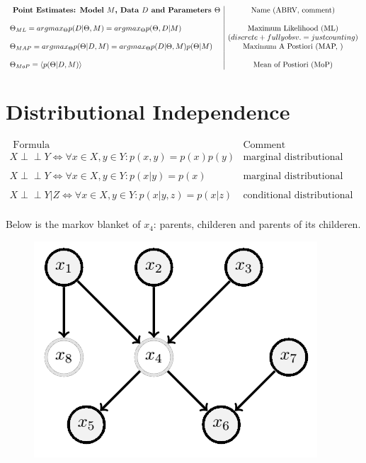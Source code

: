 \documentclass[a4paper,10pt]{article}
\newcommand{\negspace}{\!\!\!}
\newcommand{\idp}{\perp \negspace \perp}
\begin{document}
$$\begin{array}{l|c}
    \textbf{ Point Estimates: \hfill Model $M$, Data $D$ and Parameters $\Theta$} & \textrm{Name \hfill (ABRV, comment)}  \\ 
    \\
     \Theta_{\*ML} = argmax_{\Theta} p( D | \Theta, M) = argmax_{\Theta} p( \Theta, D | M)  & \textrm{Maximum Likelihood \hfill  (ML)} \\
     & ( discrete + fully obsv. = just counting) \\
     \Theta_{\*MAP} = argmax_{\Theta} p( \Theta | D, M) = argmax_{\Theta} p(D|\Theta,M)p(\Theta|M)  & \textrm{Maximum A Postiori \hfill (MAP, )} \\
     \\
     \Theta_{\*MoP} = \langle p( \Theta | D, M) \rangle & \textrm{Mean of Postiori \hfill (MoP)} \\
  \end{array}
$$
\section{Distributional Independence}

$$\begin{array}{l|c}
    \textrm{ Formula} & \textrm{Comment}  \\ 
    X \idp Y \iff  \forall x \in X, y \in Y : p(x,y) = p(x)p(y) & \textrm{marginal distributional independence for variable sets X,Y} \\
    \\
    X \idp Y \iff  \forall x \in X, y \in Y: p(x|y) = p(x) & \textrm{marginal distributional independence with CPD def.}\\
    \\
    X \idp Y | Z \iff  \forall x \in X, y \in Y : p(x|y,z) = p(x|z) & \textrm{conditional distributional independence.}\\
  \end{array}
$$

Below is the markov blanket of $x_4$: parents, childeren and parents of its childeren.
\begin{figure}[htb!]
\centering
\includegraphics[scale=0.3]{gmarkovblanky.png}
\end{figure}
\end{document}
